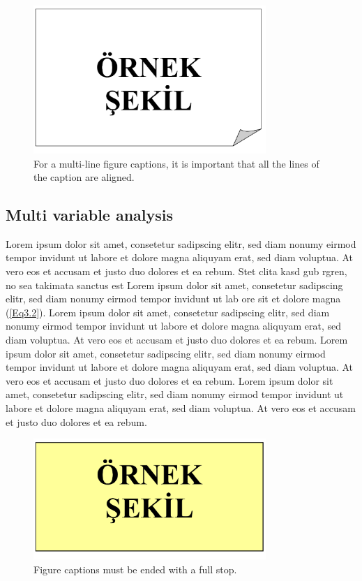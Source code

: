 \begin{figure}
	\centering
	\includegraphics[width=250pt,keepaspectratio=true]{./fig/sekil3}
	\caption{For a multi-line figure captions, it is important that all the lines of the caption are aligned.}
	\label{Figure3.2}
\end{figure}

\subsection{Multi variable analysis}

Lorem ipsum dolor sit amet, consetetur sadipscing elitr, sed diam nonumy eirmod tempor invidunt ut labore et dolore magna aliquyam erat, sed diam voluptua. At vero eos et accusam et justo duo dolores et ea rebum. Stet clita kasd gub rgren, no sea takimata sanctus est Lorem ipsum dolor sit amet, consetetur sadipscing elitr, sed diam nonumy eirmod tempor invidunt ut lab ore sit et dolore magna (\ref{Eq3.2}). Lorem ipsum dolor sit amet, consetetur sadipscing elitr, sed diam nonumy eirmod tempor invidunt ut labore et dolore magna aliquyam erat, sed diam voluptua. At vero eos et accusam et justo duo dolores et ea rebum. Lorem ipsum dolor sit amet, consetetur sadipscing elitr, sed diam nonumy eirmod tempor invidunt ut labore et dolore magna aliquyam erat, sed diam voluptua. At vero eos et accusam et justo duo dolores et ea rebum. Lorem ipsum dolor sit amet, consetetur sadipscing elitr, sed diam nonumy eirmod tempor invidunt ut labore et dolore magna aliquyam erat, sed diam voluptua. At vero eos et accusam et justo duo dolores et ea rebum.

\begin{figure}
	\centering
	\includegraphics[width=250pt,keepaspectratio=true]{./fig/sekil4}
	\caption{Figure captions must be ended with a full stop.}
	\label{Figure3.4}
\end{figure}

